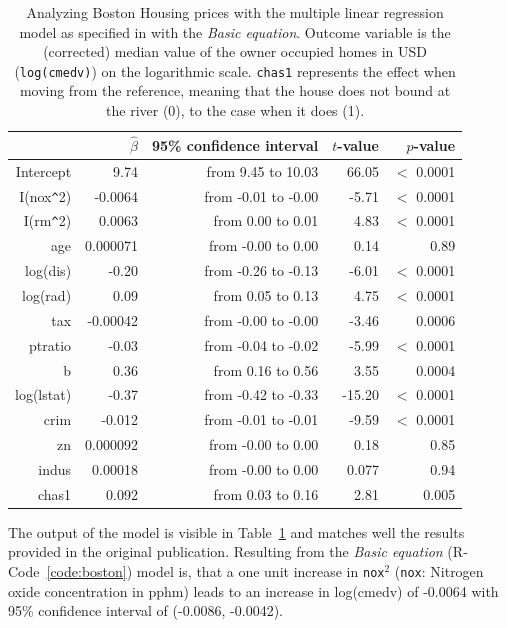 \documentclass[11pt,a4paper,twoside]{book}\usepackage[]{graphicx}\usepackage[]{xcolor}
\begin{document}
\begin{table}[!h]
\centering
\caption{Analyzing Boston Housing prices with the multiple linear regression model as specified in \cite{Harrison1978} with the \textit{Basic equation}. Outcome variable is the (corrected) median value of the owner occupied homes in USD (\texttt{log(cmedv)}) on the logarithmic scale. \texttt{chas1} represents the effect when moving from the reference, meaning that the house does not bound at the river (0), to the case when it does (1).} 
\label{tab:reg_bo}
\begingroup\footnotesize
\begin{tabular}{rrrrr}
  \toprule
 & $\hat\beta$ & 95\% confidence interval & $t$-value & $p$-value \\ 
  \midrule
Intercept & 9.74 & from 9.45 to 10.03 & 66.05 & $<$ 0.0001 \\ 
  I(nox\verb|^|2) & -0.0064 & from -0.01 to -0.00 & -5.71 & $<$ 0.0001 \\ 
  I(rm\verb|^|2) & 0.0063 & from 0.00 to 0.01 & 4.83 & $<$ 0.0001 \\ 
  age & 0.000071 & from -0.00 to 0.00 & 0.14 & 0.89 \\ 
  log(dis) & -0.20 & from -0.26 to -0.13 & -6.01 & $<$ 0.0001 \\ 
  log(rad) & 0.09 & from 0.05 to 0.13 & 4.75 & $<$ 0.0001 \\ 
  tax & -0.00042 & from -0.00 to -0.00 & -3.46 & 0.0006 \\ 
  ptratio & -0.03 & from -0.04 to -0.02 & -5.99 & $<$ 0.0001 \\ 
  b & 0.36 & from 0.16 to 0.56 & 3.55 & 0.0004 \\ 
  log(lstat) & -0.37 & from -0.42 to -0.33 & -15.20 & $<$ 0.0001 \\ 
  crim & -0.012 & from -0.01 to -0.01 & -9.59 & $<$ 0.0001 \\ 
  zn & 0.000092 & from -0.00 to 0.00 & 0.18 & 0.85 \\ 
  indus & 0.00018 & from -0.00 to 0.00 & 0.077 & 0.94 \\ 
  chas1 & 0.092 & from 0.03 to 0.16 & 2.81 & 0.005 \\ 
   \bottomrule
\end{tabular}
\endgroup
\end{table}


The output of the model is visible in Table~\ref{tab:reg_bo} and matches well the results provided in the original publication. Resulting from the \textit{Basic equation} (\textsf{R}-Code~\ref{code:boston}) model is, that a one unit increase in \texttt{nox$^2$} (\texttt{nox}: Nitrogen oxide concentration in pphm) leads to an increase in log(cmedv) of -0.0064 with 95\% confidence interval of (-0.0086, -0.0042).
\end{document}
